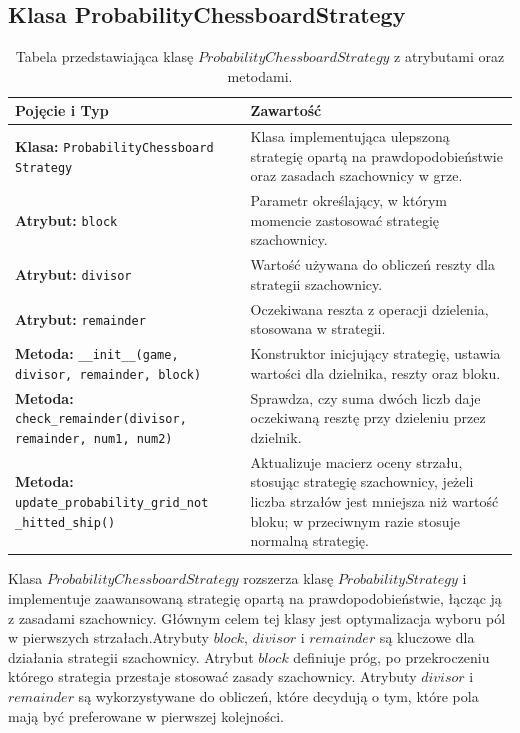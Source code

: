 \documentclass[magisterska]{pracadypl}
\begin{document}
{\subsection{Klasa ProbabilityChessboardStrategy}
\begin{table}[H]
\centering
\begin{tabularx}{\textwidth}{|p{6cm}|X|}
\hline
\textbf{Pojęcie i Typ} & \textbf{Zawartość} \\ \hline
\textbf{Klasa:} \texttt{ProbabilityChessboard Strategy} & Klasa implementująca ulepszoną strategię opartą na prawdopodobieństwie oraz zasadach szachownicy w grze. \\ \hline
\textbf{Atrybut:} \texttt{block} & Parametr określający, w którym momencie zastosować strategię szachownicy. \\ \hline
\textbf{Atrybut:} \texttt{divisor} & Wartość używana do obliczeń reszty dla strategii szachownicy. \\ \hline
\textbf{Atrybut:} \texttt{remainder} & Oczekiwana reszta z operacji dzielenia, stosowana w strategii. \\ \hline
\textbf{Metoda:} \texttt{\_\_init\_\_(game, divisor, remainder, block)} & Konstruktor inicjujący strategię, ustawia wartości dla dzielnika, reszty oraz bloku. \\ \hline
\textbf{Metoda:} \texttt{check\_remainder(divisor, remainder, num1, num2)} & Sprawdza, czy suma dwóch liczb daje oczekiwaną resztę przy dzieleniu przez dzielnik. \\ \hline
\textbf{Metoda:} \texttt{update\_probability\_grid\_not \_hitted\_ship()} & Aktualizuje macierz oceny strzału, stosując strategię szachownicy, jeżeli liczba strzałów jest mniejsza niż wartość bloku; w przeciwnym razie stosuje normalną strategię. \\ \hline
\end{tabularx}
\caption{Tabela przedstawiająca klasę $ProbabilityChessboardStrategy$ z atrybutami oraz metodami.}
\end{table}
Klasa $ProbabilityChessboardStrategy$ rozszerza klasę $ProbabilityStrategy$ i implementuje zaawansowaną strategię opartą na prawdopodobieństwie, łącząc ją z zasadami szachownicy. Głównym celem tej klasy jest optymalizacja wyboru pól w pierwszych strzałach.Atrybuty $block$, $divisor$ i $remainder$ są kluczowe dla działania strategii szachownicy. Atrybut $block$ definiuje próg, po przekroczeniu którego strategia przestaje stosować zasady szachownicy. Atrybuty $divisor$ i $remainder$ są wykorzystywane do obliczeń, które decydują o tym, które pola mają być preferowane w pierwszej kolejności.
}
\end{document}
